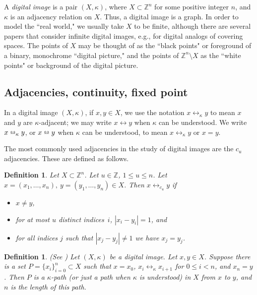 \documentclass{article}
\newtheorem{definition}[thm]{Definition}
\numberwithin{thm}{section}
\newcommand{\adj}{\leftrightarrow}
\newcommand{\adjeq}{\leftrightarroweq}
\def\Z{{\mathbb Z}}
\begin{document}
A {\em digital image} is a pair $(X,\kappa)$, where $X \subset \Z^n$ 
for some positive integer $n$, and $\kappa$ is an adjacency relation on $X$. 
Thus, a digital image is a graph.
In order to model the ``real world," we usually take $X$ to be finite,
although there are several papers that consider
infinite digital images, e.g., for digital analogs of
covering spaces. The points of $X$ may be 
thought of as the ``black points" or foreground of a 
binary, monochrome ``digital picture," and the 
points of $\Z^n \setminus X$ as the ``white points"
or background of the digital picture.

\subsection{Adjacencies, 
continuity, fixed point}

In a digital image $(X,\kappa)$, if
$x,y \in X$, we use the notation
$x \adj_{\kappa}y$ to
mean $x$ and $y$ are $\kappa$-adjacent; we may write
$x \adj y$ when $\kappa$ can be understood. 
We write $x \adjeq_{\kappa}y$, or $x \adjeq y$
when $\kappa$ can be understood, to
mean 
$x \adj_{\kappa}y$ or $x=y$.

The most commonly used adjacencies in the study of digital images 
are the $c_u$ adjacencies. These are defined as follows.
\begin{definition}
\label{cu-adj-Def}
Let $X \subset \Z^n$. Let $u \in \Z$, $1 \le u \le n$. Let 
$x=(x_1, \ldots, x_n),~y=(y_1,\ldots,y_n) \in X$. Then $x \adj_{c_u} y$ if 
\begin{itemize}
    \item $x \neq y$,
    \item for at most $u$ distinct indices~$i$,
    $|x_i - y_i| = 1$, and
    \item for all indices $j$ such that $|x_j - y_j| \neq 1$ we have $x_j=y_j$.
\end{itemize}
\end{definition}

\begin{definition}
\label{path}
(See {\rm \cite{Khalimsky}}) 
    Let $(X,\kappa)$ be a digital image. Let
    $x,y \in X$. Suppose there is a set
    $P = \{x_i\}_{i=0}^n \subset X$ such that
$x=x_0$, $x_i \adj_{\kappa} x_{i+1}$ for
$0 \le i < n$, and $x_n=y$. Then $P$ is a
{\em $\kappa$-path} (or just a {\em path}
when $\kappa$ is understood) in $X$ from $x$ to $y$,
and $n$ is the {\em length} of this path.
\end{definition}
\end{document}
